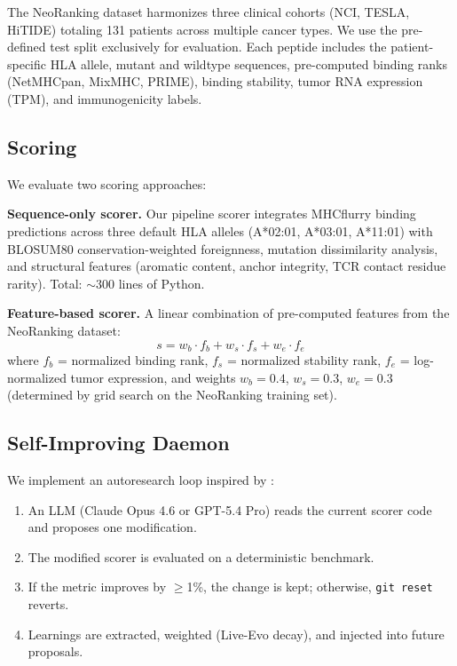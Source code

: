 \documentclass[11pt,twocolumn]{article}
\begin{document}
The NeoRanking dataset harmonizes three clinical cohorts (NCI, TESLA, HiTIDE) totaling 131 patients across multiple cancer types. We use the pre-defined test split exclusively for evaluation. Each peptide includes the patient-specific HLA allele, mutant and wildtype sequences, pre-computed binding ranks (NetMHCpan, MixMHC, PRIME), binding stability, tumor RNA expression (TPM), and immunogenicity labels.

\subsection{Scoring}

We evaluate two scoring approaches:

\textbf{Sequence-only scorer.} Our pipeline scorer integrates MHCflurry \citep{odonnell2018mhcflurry} binding predictions across three default HLA alleles (A*02:01, A*03:01, A*11:01) with BLOSUM80 conservation-weighted foreignness, mutation dissimilarity analysis, and structural features (aromatic content, anchor integrity, TCR contact residue rarity). Total: $\sim$300 lines of Python.

\textbf{Feature-based scorer.} A linear combination of pre-computed features from the NeoRanking dataset:
\begin{equation}
s = w_b \cdot f_b + w_s \cdot f_s + w_e \cdot f_e
\end{equation}
where $f_b$ = normalized binding rank, $f_s$ = normalized stability rank, $f_e$ = log-normalized tumor expression, and weights $w_b = 0.4$, $w_s = 0.3$, $w_e = 0.3$ (determined by grid search on the NeoRanking training set).

\subsection{Self-Improving Daemon}

We implement an autoresearch loop inspired by \citet{karpathy2025autoresearch}:
\begin{enumerate}[leftmargin=*,topsep=0pt,itemsep=0pt]
\item An LLM (Claude Opus 4.6 or GPT-5.4 Pro) reads the current scorer code and proposes one modification.
\item The modified scorer is evaluated on a deterministic benchmark.
\item If the metric improves by $\geq$1\%, the change is kept; otherwise, \texttt{git reset} reverts.
\item Learnings are extracted, weighted (Live-Evo decay), and injected into future proposals.
\end{enumerate}
\end{document}
